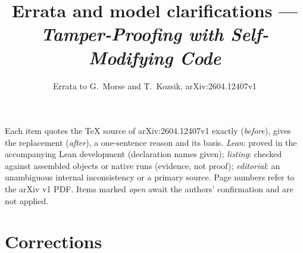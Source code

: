 \documentclass[9pt,twocolumn]{article}
\title{\vspace{-1.2cm}Errata and model clarifications --- \emph{Tamper-Proofing with Self-Modifying Code}}
\author{Errata to G.~Morse and T.~Kozsik, arXiv:2604.12407v1}
\date{}
\begin{document}
\maketitle
\small
\noindent Each item quotes the TeX source of arXiv:2604.12407v1 exactly (\emph{before}), gives the replacement (\emph{after}), a one-sentence
reason and its basis.  \emph{Lean}: proved in the accompanying Lean development (declaration names given); \emph{listing}: checked against
assembled objects or native runs (evidence, not proof); \emph{editorial}: an unambiguous internal inconsistency or a primary source.
Page numbers refer to the arXiv v1 PDF.  Items marked \emph{open} await the authors' confirmation and are not applied.
\section*{Corrections}
\end{document}
